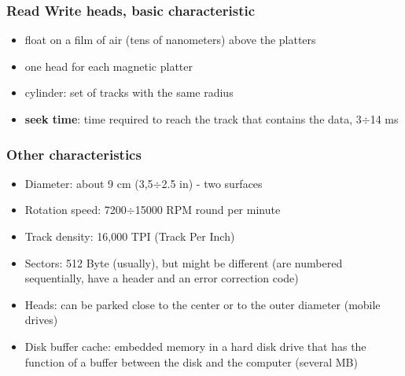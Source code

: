 \documentclass[10pt, oneside]{article}
\begin{document}
\subsubsection{Read Write heads, basic characteristic}
\begin{itemize}
    \item float on a film of air (tens of nanometers) above the platters
    \item one head for each magnetic platter
    \item cylinder: set of tracks with the same radius
    \item {\bf seek time}: time required to reach the track that contains the data, 3$\div$14 ms
\end{itemize}
\subsubsection{Other characteristics}
\begin{itemize}
    \item Diameter: about 9 cm (3,5$\div$2.5 in) - two surfaces
    \item Rotation speed: 7200$\div$15000 RPM round per minute
    \item Track density: 16,000 TPI (Track Per Inch)
    \item Sectors: 512 Byte (usually), but might be different (are numbered sequentially, have a header and an error correction code)
    \item Heads: can be parked close to the center or to the outer diameter (mobile drives)
    \item Disk buffer cache: embedded memory in a hard disk drive that has the function of a buffer between the disk and the computer (several MB)
\end{itemize}
\end{document}
